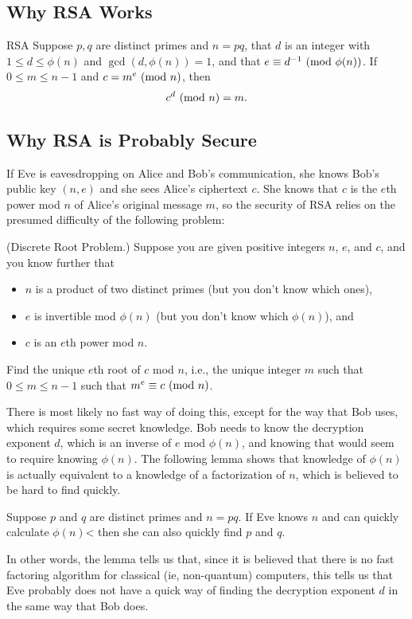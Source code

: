 \documentclass[letterpaper]{article}
\begin{document}
\subsection{Why RSA Works}
\begin{theorem}{RSA}{}
    Suppose $p, q$ are distinct primes and $n = pq$, that $d$ is an integer with $1 \leq d \leq \phi(n)$ and $\gcd(d, \phi(n)) = 1$, and that $e \equiv d^{-1} \ (\mathrm{mod}\ \phi(n))$. If $0 \leq m \leq n - 1$ and $c = m^e \ (\mathrm{mod}\ n)$, then \[c^d \ (\mathrm{mod}\ n) = m.\]
\end{theorem}


\subsection{Why RSA is Probably Secure}
If Eve is eavesdropping on Alice and Bob's communication, she knows Bob's public key $(n, e)$ and she sees Alice's ciphertext $c$. She knows that $c$ is the $e$th power mod $n$ of Alice's original message $m$, so the security of RSA relies on the presumed difficulty of the following problem: 
\begin{mdframed}
    (Discrete Root Problem.) Suppose you are given positive integers $n$, $e$, and $c$, and you know further that 
    \begin{itemize}
        \item $n$ is a product of two distinct primes (but you don't know which ones),
        \item $e$ is invertible mod $\phi(n)$ (but you don't know which $\phi(n)$), and 
        \item $c$ is an $e$th power mod $n$.
    \end{itemize}
    Find the unique $e$th root of $c$ mod $n$, i.e., the unique integer $m$ such that $0 \leq m \leq n - 1$ such that $m^e \equiv c \ (\mathrm{mod}\ n)$. 
\end{mdframed}
There is most likely no fast way of doing this, except for the way that Bob uses, which requires some secret knowledge. Bob needs to know the decryption exponent $d$, which is an inverse of $e$ mod $\phi(n)$, and knowing that would seem to require knowing $\phi(n)$. The following lemma shows that knowledge of $\phi(n)$ is actually equivalent to a knowledge of a factorization of $n$, which is believed to be hard to find quickly. 

\begin{lemma}{}{}
    Suppose $p$ and $q$ are distinct primes and $n = pq$. If Eve knows $n$ and can quickly calculate $\phi(n)$< then she can also quickly find $p$ and $q$. 
\end{lemma}
In other words, the lemma tells us that, since it is believed that there is no fast factoring algorithm for classical (ie, non-quantum) computers, this tells us that Eve probably does not have a quick way of finding the decryption exponent $d$ in the same way that Bob does. 
\end{document}

